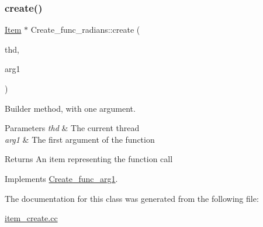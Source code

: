 \subsubsection{\texorpdfstring{create()}{create()}}
{\footnotesize\ttfamily \mbox{\hyperlink{classItem}{Item}} $\ast$ Create\+\_\+func\+\_\+radians\+::create (\begin{DoxyParamCaption}\item[{T\+HD $\ast$}]{thd,  }\item[{\mbox{\hyperlink{classItem}{Item}} $\ast$}]{arg1 }\end{DoxyParamCaption})\hspace{0.3cm}{\ttfamily [virtual]}}

Builder method, with one argument. 
\begin{DoxyParams}{Parameters}
{\em thd} & The current thread \\
\hline
{\em arg1} & The first argument of the function \\
\hline
\end{DoxyParams}
\begin{DoxyReturn}{Returns}
An item representing the function call 
\end{DoxyReturn}


Implements \mbox{\hyperlink{classCreate__func__arg1_a3e9a98f755cd82c3e762e334c955a8c9}{Create\+\_\+func\+\_\+arg1}}.



The documentation for this class was generated from the following file\+:\begin{DoxyCompactItemize}
\item 
\mbox{\hyperlink{item__create_8cc}{item\+\_\+create.\+cc}}\end{DoxyCompactItemize}
